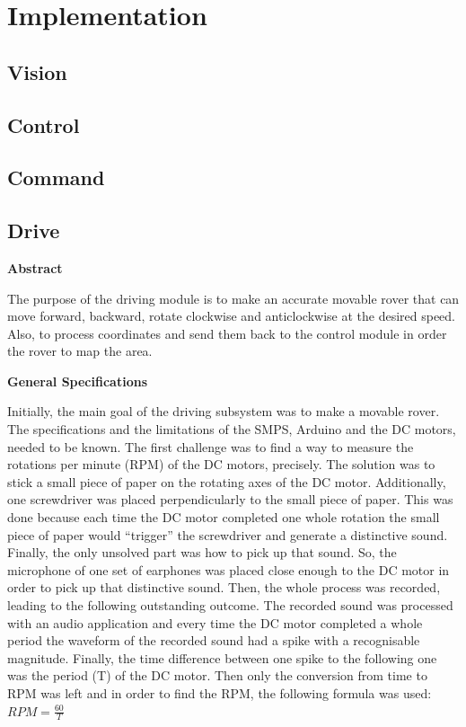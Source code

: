 \documentclass[a4paper]{article}
\begin{document}

\section{Implementation}

\subsection{Vision}

\subsection{Control}

\subsection{Command}

\subsection{Drive}

\begin{center}
\textbf{Abstract}
\end{center}
The purpose of the driving module is to make an accurate movable rover that can 
move forward, backward, rotate clockwise and anticlockwise at the desired speed.
Also, to process coordinates and send them back to the control module in order 
the rover to map the area.

\textbf{General Specifications}

Initially, the main goal of the driving subsystem was to make a movable rover. 
The specifications and the limitations of the SMPS, Arduino and the DC motors, 
needed to be known.  The first challenge was to find a way to measure the 
rotations per minute (RPM) of the DC motors, precisely. The solution was to 
stick a small piece of paper on the rotating axes of the DC motor. Additionally,
one screwdriver was placed perpendicularly to the small piece of paper. This was
done because each time the DC motor completed one whole rotation the small piece
of paper would ``trigger'' the screwdriver and generate a distinctive sound.
Finally, the only unsolved part was how to pick up that sound. So, the 
microphone of one set of earphones was placed close enough to the DC motor in order 
to pick up that distinctive sound. Then, the whole process was recorded, leading 
to the following outstanding outcome. The recorded sound was processed with an 
audio application and every time the DC motor completed a whole period the 
waveform of the recorded sound had a spike with a recognisable magnitude. 
Finally, the time difference between one spike to the following one was the 
period (T) of the DC motor. 
Then only the conversion from time to RPM was left and in order to find the RPM,
the following formula was used: \( RPM=\frac{60}{T} \) 
\end{document}
